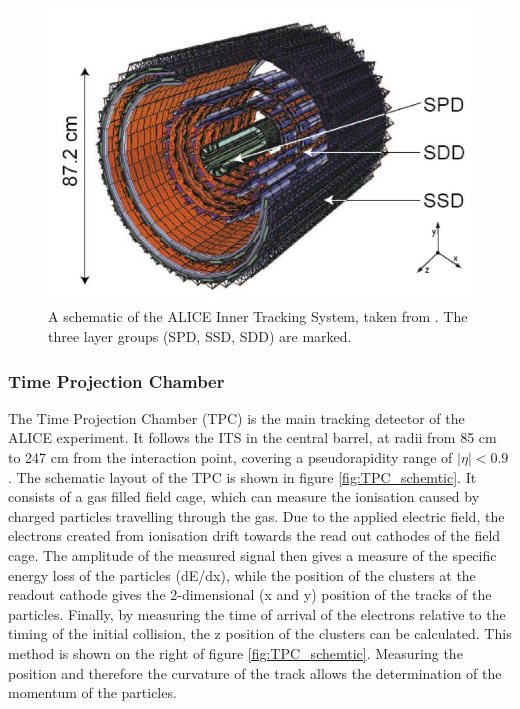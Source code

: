 \begin{figure}
    \centering
    \includegraphics[width=\textwidth]{figures/ITS_figure.jpeg}
    \caption{A schematic of the ALICE Inner Tracking System, taken from \cite{}. The three layer groups (SPD, SSD, SDD) are marked. }
    \label{fig:ITS_schematic}
\end{figure}

\subsubsection{Time Projection Chamber}
The Time Projection Chamber (TPC) is the main tracking detector of the ALICE experiment. It follows the ITS in the central barrel, at radii from 85 cm to 247 cm from the interaction point, covering a pseudorapidity range of $|\eta|<0.9$. The schematic layout of the TPC is shown in figure \ref{fig:TPC_schemtic}. It consists of a gas filled field cage, which can measure the ionisation caused by charged particles travelling through the gas. Due to the applied  electric field, the electrons created from ionisation drift towards the read out cathodes of the field cage. The amplitude of the measured signal then gives a measure of the specific energy loss of the particles (dE/dx), while the position of the clusters at the readout cathode gives the 2-dimensional (x and y) position of the tracks of the particles. Finally, by measuring the time of arrival of the electrons relative to the timing of the initial collision, the z position of the clusters can be calculated. This method is shown on the right of figure \ref{fig:TPC_schemtic}. Measuring the position and therefore the curvature of the track allows the determination of the momentum of the particles. 

